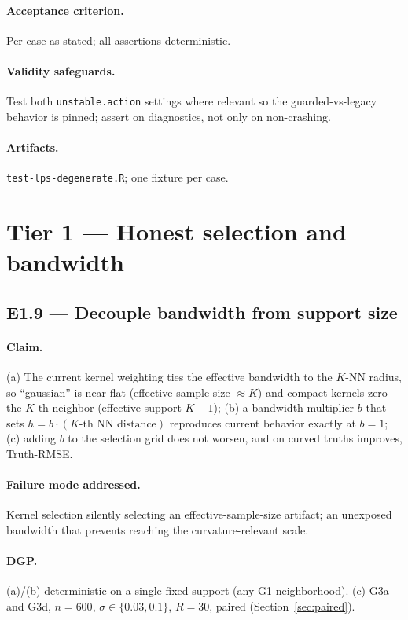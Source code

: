 \documentclass[11pt]{article}
\newcommand{\code}[1]{\texttt{#1}}
\begin{document}
\paragraph{Acceptance criterion.} Per case as stated; all assertions deterministic.

\paragraph{Validity safeguards.} Test both \code{unstable.action} settings where relevant so the
guarded-vs-legacy behavior is pinned; assert on diagnostics, not only on non-crashing.

\paragraph{Artifacts.} \code{test-lps-degenerate.R}; one fixture per case.

\section{Tier 1 — Honest selection and bandwidth}

\subsection{E1.9 — Decouple bandwidth from support size}

\paragraph{Claim.} (a) The current kernel weighting ties the effective bandwidth to the
$K$-NN radius, so ``gaussian'' is near-flat (effective sample size $\approx K$) and compact
kernels zero the $K$-th neighbor (effective support $K-1$); (b) a bandwidth multiplier $b$ that
sets $h=b\cdot(\text{$K$-th NN distance})$ reproduces current behavior exactly at $b=1$;
(c) adding $b$ to the selection grid does not worsen, and on curved truths improves, Truth-RMSE.

\paragraph{Failure mode addressed.} Kernel selection silently selecting an effective-sample-size
artifact; an unexposed bandwidth that prevents reaching the curvature-relevant scale.

\paragraph{DGP.} (a)/(b) deterministic on a single fixed support (any G1 neighborhood).
(c) G3a and G3d, $n=600$, $\sigma\in\{0.03,0.1\}$, $R=30$, paired (Section~\ref{sec:paired}).
\end{document}
